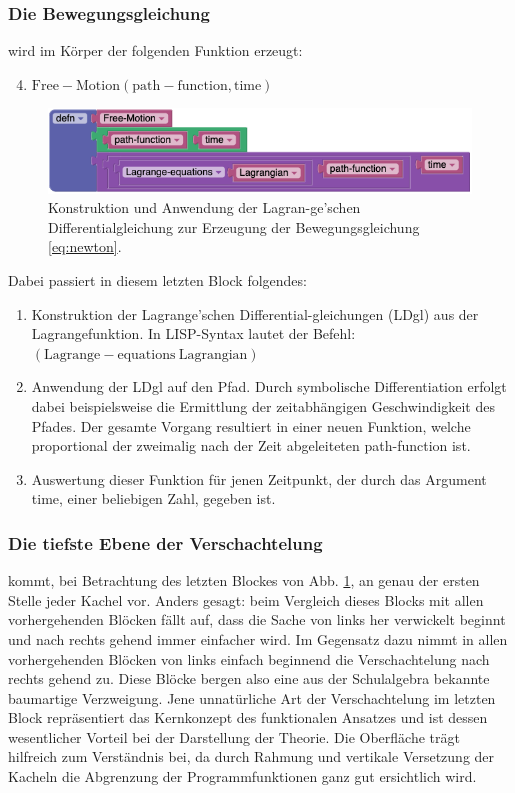 \documentclass[twocolumn, 10pt]{article}
\newcommand{\varA}[1]{{\operatorname{#1}}}
\begin{document}
\subsubsection{Die Bewegungsgleichung}

wird im Körper der folgenden Funktion erzeugt:

\begin{enumerate}[label=(\alph*)]
\setcounter{enumi}{3}
\item $\varA{Free-Motion(path-function, time)}$
\end{enumerate}

\begin{figure}[H]
\includegraphics[scale=0.35]{bilder/session_31.png}
\caption{Konstruktion und Anwendung der Lagran-ge’schen Differentialgleichung zur Erzeugung der Bewegungsgleichung \ref{eq:newton}. }
\label{fig:session31}
\end{figure}

Dabei passiert in diesem letzten Block folgendes:

\begin{enumerate}[label=(\alph*)]
\item Konstruktion der Lagrange'schen Differential-gleichungen (LDgl) aus der Lagrangefunktion. In LISP-Syntax lautet der Befehl: 
$\varA{(Lagrange-equations \ Lagrangian)}$
\item Anwendung der LDgl auf den Pfad. Durch symbolische Differentiation erfolgt dabei beispielsweise die Ermittlung der zeitabhängigen Geschwindigkeit des Pfades. Der gesamte Vorgang resultiert in einer neuen Funktion, welche proportional der zweimalig nach der Zeit abgeleiteten path-function ist.
\item Auswertung dieser Funktion für jenen Zeitpunkt, der durch das Argument time, einer beliebigen Zahl, gegeben ist.
\end{enumerate}

\subsubsection{Die tiefste Ebene der Verschachtelung}
kommt, bei Betrachtung des letzten Blockes von Abb. \ref{fig:session31}, an genau der ersten Stelle jeder Kachel vor. Anders gesagt: beim Vergleich dieses Blocks mit allen vorhergehenden Blöcken fällt auf, dass die Sache von links her verwickelt beginnt und nach rechts gehend immer einfacher wird. Im Gegensatz dazu nimmt in allen vorhergehenden Blöcken von links einfach beginnend die Verschachtelung nach rechts gehend zu. Diese Blöcke bergen also eine aus der Schulalgebra bekannte baumartige Verzweigung. Jene unnatürliche Art der Verschachtelung im letzten Block repräsentiert das Kernkonzept des funktionalen Ansatzes und ist dessen wesentlicher Vorteil bei der Darstellung der Theorie. Die Oberfläche trägt hilfreich zum Verständnis bei, da durch Rahmung und vertikale Versetzung der Kacheln die Abgrenzung der Programmfunktionen ganz gut ersichtlich wird.
\end{document}
